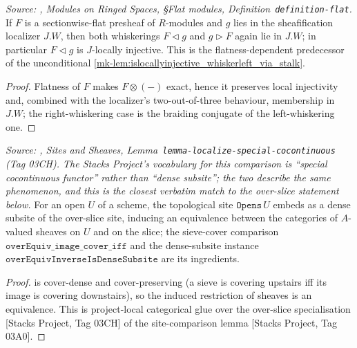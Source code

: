\begin{lemma}
  \label{mk-lem:flat_preserves_W}

  \textit{Source: \cite{stacks-project}, Modules on Ringed Spaces, \S Flat modules,
  Definition~\texttt{definition-flat}.}
  If \(F\) is a sectionwise-flat presheaf of \(R\)-modules and \(g\) lies in the
  sheafification localizer \(J.W\), then both whiskerings \(F \triangleleft g\) and
  \(g \triangleright F\) again lie in \(J.W\); in particular \(F \triangleleft g\) is
  \(J\)-locally injective. This is the flatness-dependent predecessor of the
  unconditional \ref{mk-lem:islocallyinjective_whiskerleft_via_stalk}.
\end{lemma}
\begin{proof}
 Flatness of \(F\) makes \(F \otimes (-)\) exact, hence it
  preserves local injectivity and, combined with the localizer's two-out-of-three
  behaviour, membership in \(J.W\); the right-whiskering case is the braiding conjugate
  of the left-whiskering one.
\end{proof}

\begin{lemma}
  \label{mk-lem:over_slice_sheaf_equiv}

  \textit{Source: \cite{stacks-project}, Sites and Sheaves,
  Lemma~\texttt{lemma-localize-special-cocontinuous} (Tag 03CH). The Stacks Project's
  vocabulary for this comparison is ``special cocontinuous functor'' rather than
  ``dense subsite''; the two describe the same phenomenon, and this is the closest
  verbatim match to the over-slice statement below.}
  For an open \(U\) of a scheme, the topological site \(\mathtt{Opens}\,U\) embeds as a
  dense subsite of the over-slice site, inducing an equivalence between the categories of
  \(A\)-valued sheaves on \(U\) and on the slice; the sieve-cover comparison
  \(\mathtt{overEquiv\_image\_cover\_iff}\) and the dense-subsite instance
  \(\mathtt{overEquivInverseIsDenseSubsite}\) are its ingredients.
\end{lemma}
\begin{proof}
  is cover-dense and cover-preserving (a sieve is covering upstairs iff its image is
  covering downstairs), so the induced restriction of sheaves is an equivalence. This is
  project-local categorical glue over the over-slice specialisation
  [Stacks Project, Tag 03CH] of the site-comparison lemma [Stacks Project, Tag 03A0].
\end{proof}


